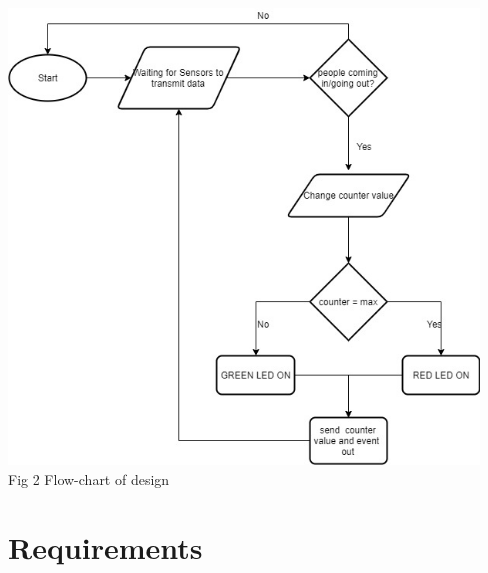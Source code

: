 \documentclass{article}
\begin{document}
\begin{center}

\includegraphics[width=12.5cm]{Untitled Diagram (2).jpg}\\
\vspace{0.5cm}
Fig 2 Flow-chart of design
\end{center}

\newpage
\section{ Requirements}
\end{document}
